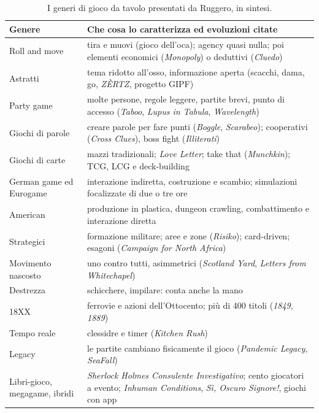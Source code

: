 \begin{table}[htbp]
\centering
\small
\begin{tabular}{@{}p{3.0cm}p{9.9cm}@{}}
\toprule
\textbf{Genere} & \textbf{Che cosa lo caratterizza ed evoluzioni citate} \\
\midrule
Roll and move & tira e muovi (gioco dell'oca); agency quasi nulla; poi
elementi economici (\emph{Monopoly}) o deduttivi (\emph{Cluedo}) \\
Astratti & tema ridotto all'osso, informazione aperta (scacchi, dama, go,
\emph{ZÈRTZ}, progetto GIPF) \\
Party game & molte persone, regole leggere, partite brevi, punto di accesso
(\emph{Taboo}, \emph{Lupus in Tabula}, \emph{Wavelength}) \\
Giochi di parole & creare parole per fare punti (\emph{Boggle},
\emph{Scarabeo}); cooperativi (\emph{Cross Clues}), boss fight
(\emph{Illiterati}) \\
Giochi di carte & mazzi tradizionali; \emph{Love Letter}; take that
(\emph{Munchkin}); TCG, LCG e deck-building \\
German game ed Eurogame & interazione indiretta, costruzione e scambio;
simulazioni focalizzate di due o tre ore \\
American & produzione in plastica, dungeon crawling, combattimento e
interazione diretta \\
Strategici & formazione militare; aree e zone (\emph{Risiko}); card-driven;
esagoni (\emph{Campaign for North Africa}) \\
Movimento nascosto & uno contro tutti, asimmetrici (\emph{Scotland Yard},
\emph{Letters from Whitechapel}) \\
Destrezza & schicchere, impilare: conta anche la mano \\
18XX & ferrovie e azioni dell'Ottocento; più di 400 titoli (\emph{1849},
\emph{1889}) \\
Tempo reale & clessidre e timer (\emph{Kitchen Rush}) \\
Legacy & le partite cambiano fisicamente il gioco (\emph{Pandemic Legacy},
\emph{SeaFall}) \\
Libri-gioco, megagame, ibridi & \emph{Sherlock Holmes Consulente
Investigativo}; cento giocatori a evento; \emph{Inhuman Conditions},
\emph{Sì, Oscuro Signore!}, giochi con app \\
\bottomrule
\end{tabular}
\caption{I generi di gioco da tavolo presentati da Ruggero, in sintesi.}
\label{a2:tab:tavolo}
\end{table}

